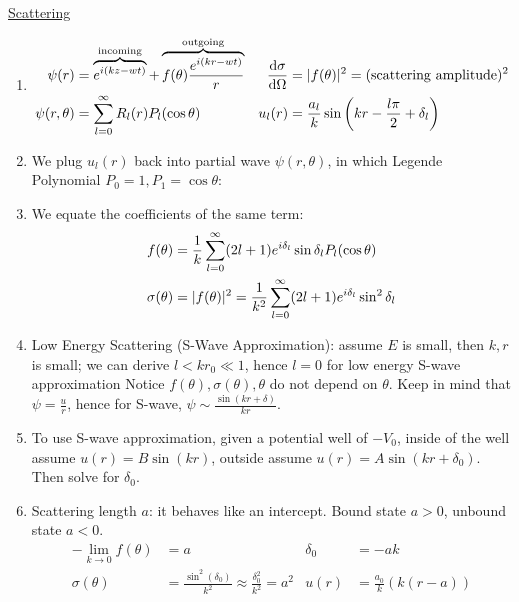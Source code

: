 \documentclass{school-22.101-notes}
\begin{document}
\uline{Scattering}
\begin{enumerate}
\item 
    \begin{align}
        \psi (r) &= \overbrace{e^{i  (k z - wt)}}^{\mathrm{incoming}} + \overbrace{ f(\theta) \frac{e^{i (k r - wt)}}{r} }^{\mathrm{outgoing}} 
        &  \frac{\mathrm{d}\sigma}{\mathrm{d}\Omega} &= |f(\theta)|^2 = (\mathrm{scattering \mbox{ } amplitude})^2 \\
        \psi(r,\theta) &= \displaystyle\sum_{l=0}^{\infty} R_l (r) P_l (\cos \theta) 
        &  u_l (r) &= \frac{a_l}{k} \sin \left( kr - \frac{l \pi}{2} + \delta_l \right) 
    \end{align}
%    
\item We plug $u_l(r)$ back into partial wave $\psi(r,\theta)$, in which Legende Polynomial $P_0 = 1, P_1 = \cos \theta$:
%
\item We equate the coefficients of the same term: 
\begin{align}
f(\theta) &= \frac{1}{k} \displaystyle\sum_{l=0}^{\infty} (2l+1) e^{i \delta_l} \sin \delta_l P_l (\cos \theta) \\
\sigma (\theta) &= |f(\theta)|^2 =  \frac{1}{k^2} \displaystyle\sum_{l=0}^{\infty} (2l+1) e^{i \delta_l} \sin^2 \delta_l 
\end{align}
%
\item Low Energy Scattering (S-Wave Approximation): assume $E$ is small, then $k,r$ is small; we can derive $l < kr_0 \ll 1$, hence $l=0$ for low energy S-wave approximation
Notice $f(\theta), \sigma (\theta), \theta$ do not depend on $\theta$. Keep in mind that $\psi = \frac{u}{r}$, hence for S-wave, $\psi \sim \frac{\sin (kr + \delta)}{kr}$.
%
\item To use S-wave approximation, given a potential well of $-V_0$, inside of the well assume $u(r) = B \sin (kr)$, outside assume $u(r) = A \sin(kr + \delta_0)$. Then solve for $\delta_0$.
%
\item Scattering length $a$: it behaves like an intercept. Bound state $a>0$, unbound state $a<0$.  
\begin{align}
- \lim_{k \to 0} f(\theta) &= a & \delta_0 &= -ak \\
\sigma (\theta) &= \frac{\sin^2 (\delta_0)}{k^2} \approx \frac{\delta_0^2}{k^2} =  a^2 & u(r) &= \frac{a_0}{k} (k (r-a)) 

\end{align}
\end{enumerate}
\end{document}
